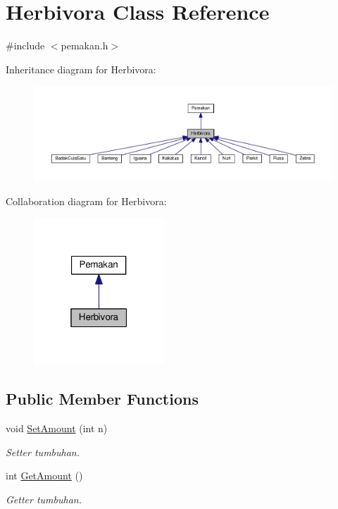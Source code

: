 \hypertarget{classHerbivora}{}\section{Herbivora Class Reference}
\label{classHerbivora}


{\ttfamily \#include $<$pemakan.\+h$>$}



Inheritance diagram for Herbivora\+:
\nopagebreak
\begin{figure}[H]
\begin{center}
\leavevmode
\includegraphics[width=350pt]{classHerbivora__inherit__graph}
\end{center}
\end{figure}


Collaboration diagram for Herbivora\+:
\nopagebreak
\begin{figure}[H]
\begin{center}
\leavevmode
\includegraphics[width=139pt]{classHerbivora__coll__graph}
\end{center}
\end{figure}
\subsection*{Public Member Functions}
\begin{DoxyCompactItemize}
\item 
void \hyperlink{classHerbivora_a271d3947a772bee2ab3512c09cea2fe9}{Set\+Amount} (int n)
\begin{DoxyCompactList}\small\item\em Setter tumbuhan. \end{DoxyCompactList}\item 
int \hyperlink{classHerbivora_a2533747fe5eb914c9731e83655af457e}{Get\+Amount} ()
\begin{DoxyCompactList}\small\item\em Getter tumbuhan. \end{DoxyCompactList}\end{DoxyCompactItemize}
